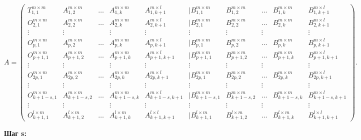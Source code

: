 \documentclass[a4paper,12pt]{article}
\begin{document}
\begin{equation*}
A = 
\begin{pmatrix}
T_{1,1}^{m \times m} & A_{1,2}^{m \times m} & \dots & A_{1,k}^{m \times m} & A_{1,k+1}^{m \times l} & | B_{1,1}^{m \times m} & B_{1,2}^{m \times m} & \dots & B_{1,k}^{m\times m} & B_{1,k+1}^{m \times l}\\
O_{2,1}^{m \times m} & A_{2,2}^{m \times m} & \dots & A_{2,k}^{m \times m} & A_{2,k+1}^{m \times l} & | B_{2,1}^{m \times m} & B_{2,2}^{m \times m} & \dots & B_{2,k}^{m\times m} & B_{2,k+1}^{m \times l}\\
\vdots & \vdots &  & \vdots & \vdots &\vdots  &\vdots   &\vdots  & \  &\vdots \\
O_{p,1}^{m \times m} & A_{p,2}^{m \times m} & \dots & A_{p,k}^{m \times m} & A_{p,k+1}^{m \times l}& | B_{p,1}^{m \times m} & B_{p,2}^{m \times m} & \dots & B_{p,k}^{m\times m} & B_{p,k+1}^{m \times l}\\
\hline
O_{p+1,1}^{m \times m} & A_{p+1,2}^{m \times m} & \dots & A_{p+1,k}^{m \times m} & A_{p+1,k+1}^{m \times l} & | B_{p+1,1}^{m \times m} & B_{p+1,2}^{m \times m} & \dots & B_{p+1,k}^{m\times m} & B_{p+1,k+1}^{m \times l}\\
\vdots & \vdots &  & \vdots & \vdots &\vdots  &\vdots   &\vdots  & \  &\vdots \\O_{2p,1}^{m \times m} & A_{2p,2}^{m \times m} & \dots & A_{2p,k}^{m \times m} & A_{2p,k+1}^{m \times l} & | B_{2p,1}^{m \times m} & B_{2p,2}^{m \times m} & \dots & B_{2p,k}^{m\times m} & B_{2p,k+1}^{m \times l}\\
\hline
\vdots & \vdots &  & \vdots & \vdots &\vdots  &\vdots   &\vdots  & \  &\vdots \\\hline
O_{k+1-s,1}^{m \times m} & A_{k+1-s,2}^{m \times m} & \dots & A_{k+1-s,k}^{m \times m} & A_{k+1-s,k+1}^{m \times l} & | B_{k+1-s,1}^{m \times m} & B_{k+1-s,2}^{m \times m} & \dots & B_{k+1-s,k}^{m\times m} & B_{k+1-s,k+1}^{m \times l}\\
\vdots & \vdots &  & \vdots & \vdots &\vdots  &\vdots   &\vdots  & \  &\vdots \\
O_{k+1,1}^{l \times m} & A_{k+1,2}^{l \times m} & \dots & A_{k+1,k}^{l \times m} & A_{k+1,k+1}^{l \times l} & | B_{k+1,1}^{l \times m} & B_{k+1,2}^{l \times m} & \dots & B_{k+1,k}^{l\times m} & B_{k+1,k+1}^{l \times l}
\end{pmatrix}.
\end{equation*}

\textbf{ Шаг s:}\\
\end{document}
